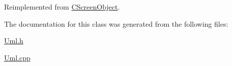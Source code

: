 Reimplemented from \mbox{\hyperlink{class_c_screen_object_ab682c1e08f001e666f0cec280e1e9eaa}{C\+Screen\+Object}}.



The documentation for this class was generated from the following files\+:\begin{DoxyCompactItemize}
\item 
\mbox{\hyperlink{_uml_8h}{Uml.\+h}}\item 
\mbox{\hyperlink{_uml_8cpp}{Uml.\+cpp}}\end{DoxyCompactItemize}
